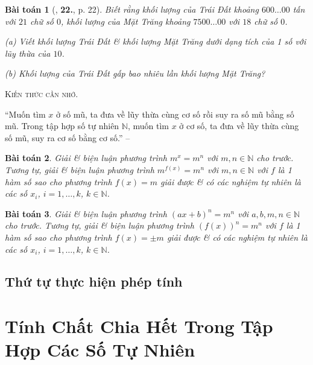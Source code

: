 \documentclass{article}
\numberwithin{equation}{section}
\newtheorem{baitoan}{Bài toán}[section]
\begin{document}
\begin{baitoan}[\cite{Trong_Toan_6_2021}, \textbf{22.}, p. 22]
	Biết rằng khối lượng của Trái Đất khoảng $600\ldots 00$ tấn với $21$ chữ số $0$, khối lượng của Mặt Trăng khoảng $7500\ldots 00$ với $18$ chữ số $0$.
	\begin{enumerate*}
		\item[(a)] Viết khối lượng Trái Đất \& khối lượng Mặt Trăng dưới dạng tích của 1 số với lũy thừa của $10$.
		\item[(b)] Khối lượng của Trái Đất gấp bao nhiêu lần khối lượng Mặt Trăng?
	\end{enumerate*}
\end{baitoan}
\noindent\textsc{Kiến thức cần nhớ.}
\begin{tcolorbox}
	``Muốn tìm $x$ ở số mũ, ta đưa về lũy thừa cùng cơ số rồi suy ra số mũ bằng số mũ. Trong tập hợp số tự nhiên $\mathbb{N}$, muốn tìm $x$ ở cơ số, ta đưa về lũy thừa cùng số mũ, suy ra cơ số bằng cơ số.'' -- \cite[p. 22]{Trong_Toan_6_2021}
\end{tcolorbox}

\begin{baitoan}
	Giải \& biện luận phương trình $m^x = m^n$ với $m,n\in\mathbb{N}$ cho trước. Tương tự, giải \& biện luận phương trình $m^{f(x)} = m^n$ với $m,n\in\mathbb{N}$ với $f$ là 1 hàm số sao cho phương trình $f(x) = m$ giải được \& có các nghiệm tự nhiên là các số $x_i$, $i = 1,\ldots,k$, $k\in\mathbb{N}$.
\end{baitoan}

\begin{baitoan}
	Giải \& biện luận phương trình $(ax + b)^n = m^n$ với $a,b,m,n\in\mathbb{N}$ cho trước. Tương tự, giải \& biện luận phương trình $(f(x))^n = m^n$ với $f$ là 1 hàm số sao cho phương trình $f(x) = \pm m$ giải được \& có các nghiệm tự nhiên là các số $x_i$, $i = 1,\ldots,k$, $k\in\mathbb{N}$.
\end{baitoan}

\subsection{Thứ tự thực hiện phép tính}


\section{Tính Chất Chia Hết Trong Tập Hợp Các Số Tự Nhiên}
\end{document}
